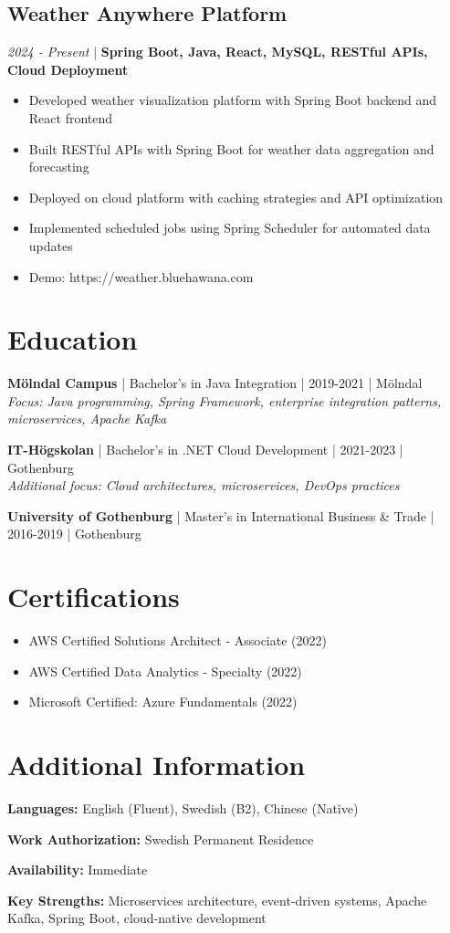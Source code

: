 \documentclass[11pt,a4paper]{article}
\begin{document}
\subsection*{Weather Anywhere Platform}
\textit{2024 - Present} | \textbf{Spring Boot, Java, React, MySQL, RESTful APIs, Cloud Deployment}
\begin{itemize}[leftmargin=*, itemsep=1pt]
\item Developed weather visualization platform with Spring Boot backend and React frontend
\item Built RESTful APIs with Spring Boot for weather data aggregation and forecasting
\item Deployed on cloud platform with caching strategies and API optimization
\item Implemented scheduled jobs using Spring Scheduler for automated data updates
\item Demo: https://weather.bluehawana.com
\end{itemize}

\section*{Education}

\textbf{Mölndal Campus} | Bachelor's in Java Integration | 2019-2021 | Mölndal\\
\textit{Focus: Java programming, Spring Framework, enterprise integration patterns, microservices, Apache Kafka}

\textbf{IT-Högskolan} | Bachelor's in .NET Cloud Development | 2021-2023 | Gothenburg\\
\textit{Additional focus: Cloud architectures, microservices, DevOps practices}

\textbf{University of Gothenburg} | Master's in International Business \& Trade | 2016-2019 | Gothenburg

\section*{Certifications}

\begin{itemize}[leftmargin=*, itemsep=2pt]
\item AWS Certified Solutions Architect - Associate (2022)
\item AWS Certified Data Analytics - Specialty (2022)
\item Microsoft Certified: Azure Fundamentals (2022)
\end{itemize}

\section*{Additional Information}

\textbf{Languages:} English (Fluent), Swedish (B2), Chinese (Native)

\textbf{Work Authorization:} Swedish Permanent Residence

\textbf{Availability:} Immediate

\textbf{Key Strengths:} Microservices architecture, event-driven systems, Apache Kafka, Spring Boot, cloud-native development
\end{document}
